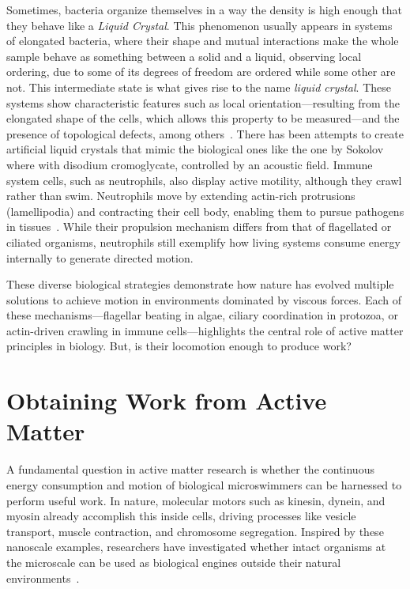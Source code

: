 Sometimes, bacteria organize themselves in a way the density is high enough that they behave like a \textit{Liquid Crystal}. This phenomenon usually appears in systems of elongated bacteria, where their shape and mutual interactions make the whole sample behave as something between a solid and a liquid, observing local ordering, due to some of its degrees of freedom are ordered while some other are not. This intermediate state is what gives rise to the name \textit{liquid crystal}. These systems show characteristic features such as local orientation—resulting from the elongated shape of the cells, which allows this property to be measured—and the presence of topological defects, among others~\cite{decamp2015orientational}. There has been attempts to create artificial liquid crystals that mimic the biological ones like the one by Sokolov~\cite{sokolov2025synthetic} where with disodium cromoglycate, controlled by an acoustic field.
Immune system cells, such as neutrophils, also display active motility, although they crawl rather than swim. Neutrophils move by extending actin-rich protrusions (lamellipodia) and contracting their cell body, enabling them to pursue pathogens in tissues~\cite{friedl2004collective}. While their propulsion mechanism differs from that of flagellated or ciliated organisms, neutrophils still exemplify how living systems consume energy internally to generate directed motion.

These diverse biological strategies demonstrate how nature has evolved multiple solutions to achieve motion in environments dominated by viscous forces. Each of these mechanisms—flagellar beating in algae, ciliary coordination in protozoa, or actin-driven crawling in immune cells—highlights the central role of active matter principles in biology. But, is their locomotion enough to produce work?

\section{Obtaining Work from Active Matter}

A fundamental question in active matter research is whether the continuous energy consumption and motion of biological microswimmers can be harnessed to perform useful work. In nature, molecular motors such as kinesin, dynein, and myosin already accomplish this inside cells, driving processes like vesicle transport, muscle contraction, and chromosome segregation. Inspired by these nanoscale examples, researchers have investigated whether intact organisms at the microscale can be used as biological engines outside their natural environments~\cite{schliwa2003molecular}.

